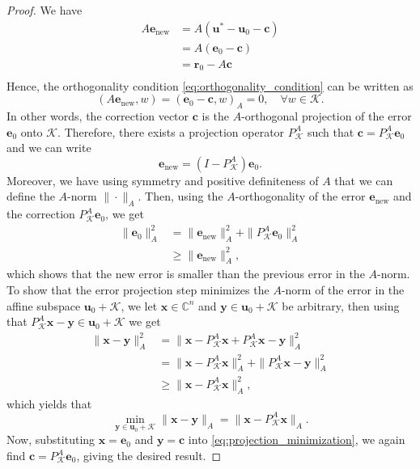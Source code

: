 \begin{proof}
We have
\begin{align*}
    A\mathbf{e}_{\text{new}} & = A(\mathbf{u}^{*} - \mathbf{u}_0 - \mathbf{c}) \\
               & = A(\mathbf{e}_0 - \mathbf{c})       \\
               & = \mathbf{r}_0 - A\mathbf{c} \\
\end{align*}
Hence, the orthogonality condition \cref{eq:orthogonality_condition} can be written as
\[
    (A\mathbf{e}_{\text{new}}, w) = (\mathbf{e}_0 - \mathbf{c}, w)_{A} = 0, \quad \forall w \in \mathcal{K}.
\]
In other words, the correction vector $\mathbf{c}$ is the $A$-orthogonal projection of the error $\mathbf{e}_0$ onto $\mathcal{K}$. Therefore, there exists a projection operator $P_{\mathcal{K}}^{A}$ such that $\mathbf{c} = P_{\mathcal{K}}^{A}\mathbf{e}_0$ and we can write
\[
  \mathbf{e}_{\text{new}} = (I - P_{\mathcal{K}}^{A}) \mathbf{e}_0.
\]
Moreover, we have using symmetry and positive definiteness of $A$ that we can define the $A$-norm $\|\cdot\|_A$. Then, using the $A$-orthogonality of the error $\mathbf{e}_{\text{new}}$ and the correction $P_{\mathcal{K}}^{A}\mathbf{e}_0$, we get
\begin{align*}
  \|\mathbf{e}_{0}\|_A^2 &= \|\mathbf{e}_{\text{new}}\|_A^2 + \|P_{\mathcal{K}}^{A}\mathbf{e}_0\|_A^2\\
  &\geq \|\mathbf{e}_{\text{new}}\|_A^2,
\end{align*}
which shows that the new error is smaller than the previous error in the $A$-norm. To show that the error projection step minimizes the $A$-norm of the error in the affine subspace $\mathbf{u}_0 + \mathcal{K}$, we let $\mathbf{x}\in\mathbb{C}^n$ and $\mathbf{y} \in \mathbf{u}_0 + \mathcal{K}$ be arbitrary, then using that $P_{\mathcal{K}}^{A}\mathbf{x} - \mathbf{y} \in \mathbf{u}_0 + \mathcal{K}$ we get
\begin{align*}
  \|\mathbf{x} - \mathbf{y}\|_A^2 &= \|\mathbf{x} - P_{\mathcal{K}}^{A}\mathbf{x} + P_{\mathcal{K}}^{A}\mathbf{x} - \mathbf{y} \|_A^2 \\
  &= \|\mathbf{x} - P_{\mathcal{K}}^{A}\mathbf{x}\|_A^2 + \|P_{\mathcal{K}}^{A}\mathbf{x} - \mathbf{y}\|_A^2 \\
  &\geq \|\mathbf{x} - P_{\mathcal{K}}^{A}\mathbf{x}\|_A^2,
\end{align*}
which yields that \cite[Theorem 1.38]{iter_method_saad}
\begin{equation}
  \min_{\mathbf{y} \in \mathbf{u}_0 + \mathcal{K}} \|\mathbf{x} - \mathbf{y}\|_A = \|\mathbf{x} - P_{\mathcal{K}}^{A}\mathbf{x}\|_A.
  \label{eq:projection_minimization}
\end{equation}
Now, substituting $\mathbf{x} = \mathbf{e}_0$ and $\mathbf{y} = \mathbf{c}$ into \cref{eq:projection_minimization}, we again find $\mathbf{c} = P_{\mathcal{K}}^{A}\mathbf{e}_0$, giving the desired result.
\end{proof}

